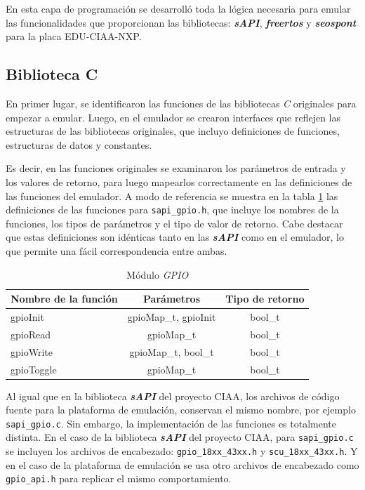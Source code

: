 En esta capa de programación se desarrolló toda la lógica necesaria para emular las funcionalidades que proporcionan las bibliotecas: \textit{\textbf{sAPI}}, \textit{\textbf{freertos}} y \textit{\textbf{seos\textunderscore pont}} para la placa EDU-CIAA-NXP.

\subsection{Biblioteca C}

En primer lugar, se identificaron las funciones de las bibliotecas \textit{C} originales para empezar a emular. Luego, en el emulador se crearon interfaces que reflejen las estructuras de las bibliotecas originales, que incluyo definiciones de funciones, estructuras de datos y constantes.

Es decir, en las funciones originales se examinaron los parámetros de entrada y los valores de retorno, para luego mapearlos correctamente en las definiciones de las funciones del emulador.  A modo de referencia se muestra en la tabla \ref{tab:gpioMap} las definiciones de las funciones para \texttt{sapi\_gpio.h}, que incluye los nombres de la funciones, los tipos de parámetros y el tipo de valor de retorno. Cabe destacar que estas definiciones son idénticas tanto en las \textit{\textbf{sAPI}} como en el emulador, lo que permite una fácil correspondencia entre ambas.

\begin{table}[h]
	\centering
	\caption[Módulo \textit{GPIO}]{Módulo \textit{GPIO}}
	\begin{tabular}{l c c}    
		\toprule
		\textbf{Nombre de la función} 	 & \textbf{Parámetros} 		& \textbf{Tipo de retorno}  \\
		\midrule
		gpioInit & gpioMap\_t, gpioInit				&  bool\_t \\		
		gpioRead	 & gpioMap\_t				&  bool\_t \\
		gpioWrite	 & gpioMap\_t, bool\_t				&  bool\_t \\
		gpioToggle	 & gpioMap\_t				&  bool\_t \\
		\bottomrule
		\hline
	\end{tabular}
	\label{tab:gpioMap}
\end{table}



Al igual que en la biblioteca \textit{\textbf{sAPI}} del proyecto CIAA, los archivos de código fuente para la plataforma de emulación, conservan el mismo nombre, por ejemplo  \texttt{sapi\_gpio.c}. Sin embargo, la implementación de las funciones es totalmente distinta. En el caso de la biblioteca \textit{\textbf{sAPI}} del proyecto CIAA, para \texttt{sapi\_gpio.c}  se incluyen los archivos de encabezado: \texttt{gpio\_18xx\_43xx.h} y \newline \texttt{scu\_18xx\_43xx.h}. Y en el caso de la plataforma de emulación se usa otro archivos de encabezado como \texttt{gpio\_api.h} para replicar el mismo comportamiento.

